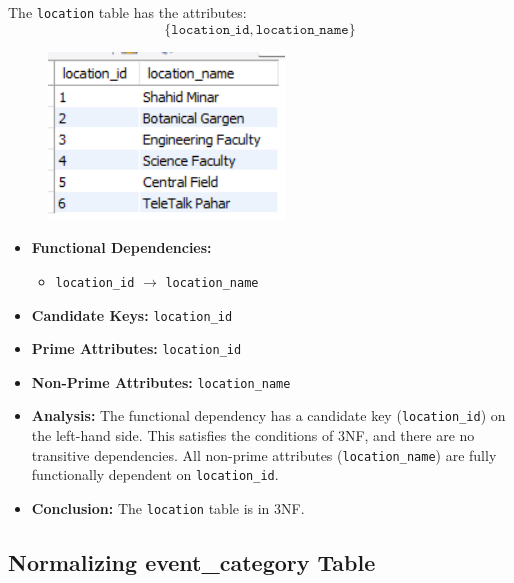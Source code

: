 The \texttt{location} table has the attributes:
\[
\{ \texttt{location\_id}, \texttt{location\_name} \}
\]
\begin{figure}
    [h]
    \centering
    \includegraphics{images/table_data/location_table.png}
\end{figure}
\begin{itemize}
    \item \textbf{Functional Dependencies:}
    \begin{itemize}
        \item \texttt{location\_id} $\rightarrow$ \texttt{location\_name}
    \end{itemize}

    \item \textbf{Candidate Keys:} \texttt{location\_id}

    \item \textbf{Prime Attributes:} \texttt{location\_id}

    \item \textbf{Non-Prime Attributes:} \texttt{location\_name}

    \item \textbf{Analysis:} The functional dependency has a candidate key 
    (\texttt{location\_id}) on the left-hand side. This satisfies the conditions of 3NF, 
    and there are no transitive dependencies. All non-prime attributes 
    (\texttt{location\_name}) are fully functionally dependent on \texttt{location\_id}.

    \item \textbf{Conclusion:} The \texttt{location} table is in 3NF.
\end{itemize}

\subsection{Normalizing event\_category Table}

